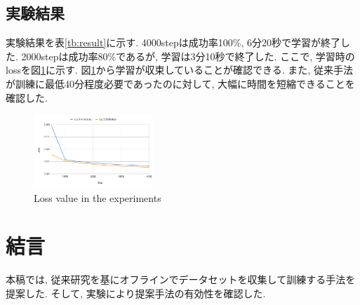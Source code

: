 \documentclass[10pt]{ujarticle}
\begin{document}
    \subsection{実験結果}実験結果を表\ref{tb:result}に示す. 4000stepは成功率100\%, 6分20秒で学習が終了した. 2000stepは成功率80\%であるが, 学習は3分10秒で終了した. ここで, 学習時のlossを図\ref{Fig:loss}に示す. 図\ref{Fig:loss}から学習が収束していることが確認できる. また, 従来手法が訓練に最低40分程度必要であったのに対して, 大幅に時間を短縮できることを確認した. 

    \begin{table}[h]
        \caption{Number of successes in the experiment}
        \centering
        \label{tb:result}
      \end{table}

    \begin{figure}[h]
        \centering
        \includegraphics[width=0.4\textwidth]{fig/loss_compe.png}
        \caption{Loss value in the experiments}
        \label{Fig:loss}
    \end{figure}

    \section{結\hspace{2zw}言}%
    本稿では, 従来研究を基にオフラインでデータセットを収集して訓練する手法を提案した. そして, 実験により提案手法の有効性を確認した. 
\end{document}
